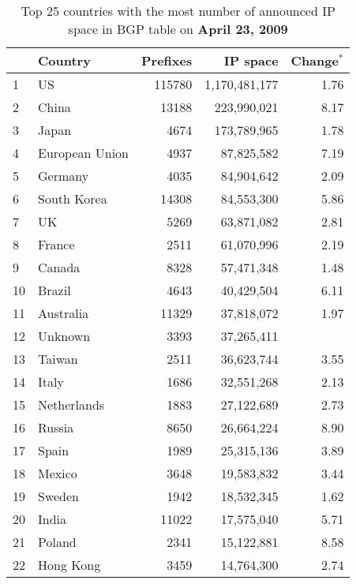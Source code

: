 \begin{table}[p]
	\begin{center}
	\caption{Top 25 countries with the most number of announced IP space in BGP table on \textbf{April 23, 2009}}
	\label{tab:top25 bgp ip space 2009}
	\begin{tabular}{|l||l|r|r|r|}
		\hline
		&      \bf Country		& \bf Prefixes  &       \bf IP space 	& \bf Change$^{*}$ 	\tabularnewline \hline 
1       &       US      		&       115780  &       1,170,481,177   & 1.76			\tabularnewline \hline
2       &       China   		&       13188   &       223,990,021     & 8.17			\tabularnewline \hline
3       &       Japan   		&       4674    &       173,789,965     & 1.78			\tabularnewline \hline
4       &       European Union  &       4937    &       87,825,582      & 7.19			\tabularnewline \hline
5       &       Germany 		&       4035    &       84,904,642      & 2.09			\tabularnewline \hline
6       &       South Korea     &       14308   &       84,553,300      & 5.86			\tabularnewline \hline
7       &       UK      		&       5269    &       63,871,082      & 2.81			\tabularnewline \hline
8       &       France  		&       2511    &       61,070,996      & 2.19			\tabularnewline \hline
9       &       Canada  		&       8328    &       57,471,348      & 1.48			\tabularnewline \hline
10      &       Brazil  		&       4643    &       40,429,504      & 6.11			\tabularnewline \hline
11      &       Australia       &       11329   &       37,818,072      & 1.97			\tabularnewline \hline
12      &       Unknown			&       3393    &       37,265,411      & 				\tabularnewline \hline
13      &       Taiwan  		&       2511    &       36,623,744      & 3.55			\tabularnewline \hline
14      &       Italy   		&       1686    &       32,551,268      & 2.13			\tabularnewline \hline
15      &       Netherlands     &       1883    &       27,122,689      & 2.73			\tabularnewline \hline
16      &       Russia  		&       8650    &       26,664,224      & 8.90			\tabularnewline \hline
17      &       Spain   		&       1989    &       25,315,136      & 3.89			\tabularnewline \hline
18      &       Mexico  		&       3648    &       19,583,832      & 3.44			\tabularnewline \hline
19      &       Sweden  		&       1942    &       18,532,345      & 1.62			\tabularnewline \hline
20      &       India   		&       11022   &       17,575,040      & 5.71			\tabularnewline \hline
21      &       Poland  		&       2341    &       15,122,881      & 8.58			\tabularnewline \hline
22      &       Hong Kong       &       3459    &       14,764,300      & 2.74			\tabularnewline \hline

\end{tabular}
\end{center}
\end{table}
